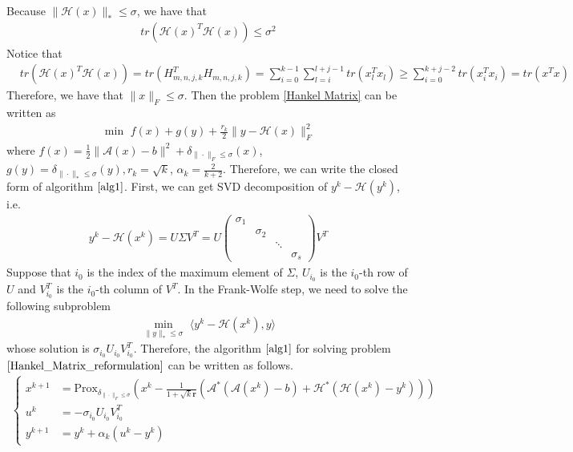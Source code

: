 \documentclass{article}
\numberwithin{equation}{section}
\begin{document}
Because $\|\mathcal{H}(x)\rVert_* \leq \sigma$, we have that
\begin{align}
    tr\left(\mathcal{H}(x)^T\mathcal{H}(x)\right) \leq \sigma^2 \nonumber
\end{align}
Notice that 
\begin{align}
    &tr\left(\mathcal{H}(x)^T\mathcal{H}(x)\right)  = 
    tr\left(H_{m,n,j,k}^T H_{m,n,j,k}\right) =\sum\limits_{i =0}^{k-1}\sum\limits_{l=i}^{l+j-1} 
    tr\left(x_l^Tx_l\right) \geq \sum\limits_{i=0}^{k+j-2} tr\left(x_i^Tx_i\right)
    = tr\left(x^Tx\right) \nonumber
\end{align}
Therefore, we have that $\|x\rVert_F \leq \sigma$.
Then the problem \eqref{Hankel Matrix} can be written as 
\begin{align}\label{Hankel_Matrix_reformulation}
    \min\hspace{4pt} f(x) + g(y) +\frac{r_k}{2}\|y-\mathcal{H}(x) \rVert_F^2 
\end{align}
where $f(x) = \frac{1}{2}\|\mathcal{A}(x)-b\rVert^2 + \delta_{\|\cdot\rVert_F \leq \sigma}(x)$, 
$g(y) = \delta_{\|\cdot\rVert_* \leq \sigma}(y), r_k = \sqrt{k}$, $\alpha_k =\frac{2}{k+2}$.
Therefore, we can write the closed form of algorithm $\ref{alg1}$.
First, we can get SVD decomposition of $y^k - \mathcal{H}(y^k)$, i.e.
\begin{align}
    y^k -\mathcal{H}(x^k) = U\Sigma V^T  = U \left(\begin{array}{cccc}
        \sigma_1 &  & & \\
          &\sigma_2 & & \\
          &   & \ddots & \\
          &   &     &\sigma_s
    \end{array}\right)  V^T \nonumber
\end{align}
Suppose that $i_0$ is the index of the maximum element of $\Sigma$, $U_{i_0}$ is the $i_0$-th row of $U$ and 
$V^T_{i_0}$ is the $i_0$-th column of $V^T$. 
In the Frank-Wolfe step, 
we need  to solve the following subproblem
\begin{align}
    \min\limits_{\|y\rVert_* \leq \sigma} \hspace{4pt} \langle y^k - \mathcal{H}(x^k), y\rangle \nonumber
\end{align}
whose solution is $\sigma_{i_0}U_{i_0}V_{i_0}^T$. Therefore, the algorithm $\ref{alg1}$ for solving 
problem $\eqref{Hankel_Matrix_reformulation}$ can be written as follows. 
\begin{align}
    \left\{
        \begin{aligned}
            x^{k+1} &= \mathrm{Prox}_{\delta_{\|\cdot\rVert_F \leq \sigma}}\left(x^k-\frac{1}{1+\sqrt{k}\mathbf{r}}\left(\mathcal{A^*}\left(\mathcal{A}(x^k)-b\right)
            +\mathcal{H^*}\left(\mathcal{H}(x^k) -y^k\right)\right)\right) \\
            u^k &= -\sigma_{i_0}U_{i_0}V_{i_0}^T \\
            y^{k+1} &= y^k+ \alpha_k(u^k-y^k)
        \end{aligned}
     \right.
\end{align}



\end{document}
